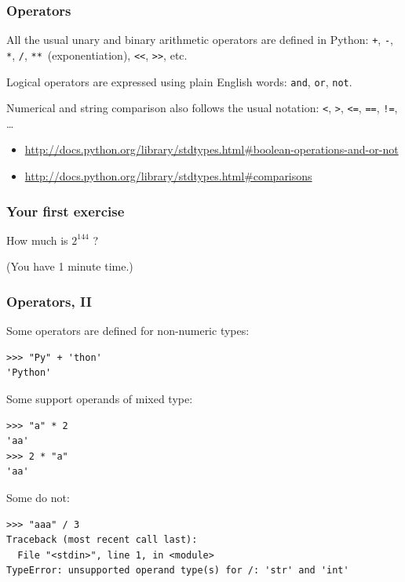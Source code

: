 \documentclass[english,serif,mathserif,xcolor=pdftex,dvipsnames,table]{beamer}
\begin{document}
\begin{frame}[fragile]
  \frametitle{Operators}
  All the usual unary and binary arithmetic operators are
  defined in Python: \texttt{+}, \texttt{-}, \texttt{*}, \texttt{/},
  \texttt{**}~(exponentiation), \texttt{<{}<}, \texttt{>{}>}, etc.

  \+
  Logical operators are expressed using plain English words:
  \texttt{and}, \texttt{or}, \texttt{not}.

  \+
  Numerical and string comparison also follows the usual notation:
  \texttt{<}, \texttt{>}, \texttt{<=}, \texttt{==}, \texttt{!=},
  \ldots

  \+
  \begin{references}
    \tiny
    \begin{itemize}
    \item
      \url{http://docs.python.org/library/stdtypes.html#boolean-operations-and-or-not}
    \item
      \url{http://docs.python.org/library/stdtypes.html#comparisons}
    \end{itemize}
  \end{references}
\end{frame}


\begin{frame}
  \frametitle{Your first exercise}
    \begin{center}
      {\Large How much is \href{http://www.pythonchallenge.com}{$2^{144}$} ?}

      \+ (You have 1 minute time.)
    \end{center}
\end{frame}


\begin{frame}[fragile]
  \frametitle{Operators, II}
  \smaller

  Some operators are defined for non-numeric types:
\begin{lstlisting}
>>> "Py" + 'thon'
'Python'
\end{lstlisting}

  \+
  Some support operands of mixed type:
\begin{lstlisting}
>>> "a" * 2
'aa'
>>> 2 * "a"
'aa'
\end{lstlisting}

  \+
  Some do not:
\begin{lstlisting}[basicstyle=\footnotesize\ttfamily]
>>> "aaa" / 3
Traceback (most recent call last):
  File "<stdin>", line 1, in <module>
TypeError: unsupported operand type(s) for /: 'str' and 'int'
\end{lstlisting}
\end{frame}
\end{document}
